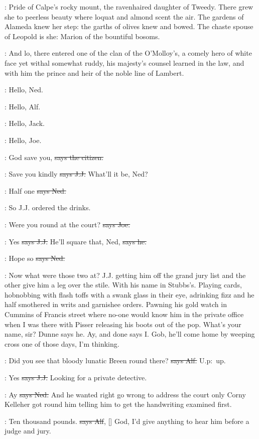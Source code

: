 :
Pride of Calpe's rocky mount,
the ravenhaired daughter of Tweedy.
There grew she to peerless beauty where loquat and almond scent the air.
The gardens of Alameda knew her step:
the garths of olives knew and
bowed.
The chaste spouse of Leopold is she:
Marion of the bountiful
bosoms.

:
And lo,
there entered one of the clan of the O'Molloy's,
a comely hero
of white face yet withal somewhat ruddy,
his majesty's counsel learned in
the law,
and with him the prince and heir of the noble line of Lambert.

\bergan:
Hello,
Ned.

\lambert:
Hello,
Alf.

\joe:
Hello,
Jack.

\jjom:
Hello,
Joe.

\citizen:
God save you,
\sout{says the citizen.}

\jjom:
Save you kindly
\sout{says J.J.}
What'll it be,
Ned?

\lambert:
Half one
\sout{says Ned.}

\Nq:
So J.J.
ordered the drinks.

\joe:
Were you round at the court?
\sout{says Joe.}

\jjom:
Yes
\sout{says J.J.}
He'll square that,
Ned,
\sout{says he.}

\lambert:
Hope so
\sout{says Ned.}

\Nq:
Now what were those two at?
J.J.
getting him off the grand jury list
and the other give him a leg over the stile.
With his name in Stubbs's.
Playing cards,
hobnobbing with flash toffs with a swank glass in their
eye,
adrinking fizz and he half smothered in writs and garnishee orders.
Pawning his gold watch in Cummins of Francis street where no-one would
know him in the private office when I was there with Pisser releasing his
boots out of the pop.
What's your name,
sir?
Dunne says he.
Ay,
and done
says I.
Gob,
he'll come home by weeping cross one of those days,
I'm
thinking.%

\bergan:
Did you see that bloody lunatic Breen round there?
\sout{says Alf.} U.p:~up.

\jjom:
Yes
\sout{says J.J.}
Looking for a private detective.

\lambert:
Ay
\sout{says Ned.}
And he wanted right go wrong to address the court only
Corny Kelleher got round him telling him to get the handwriting examined
first.

\bergan:
Ten thousand pounds.
\sout{says Alf},
[]
God,
I'd give anything to hear
him before a judge and jury.

